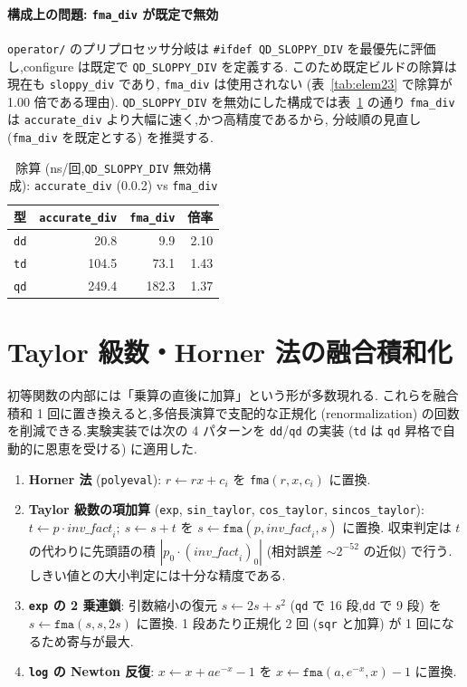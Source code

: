 \documentclass[a4paper,10pt]{ltjsarticle}
\begin{document}
\paragraph{構成上の問題: \texttt{fma\_div} が既定で無効}
\texttt{operator/} のプリプロセッサ分岐は \texttt{\#ifdef QD\_SLOPPY\_DIV}
を最優先に評価し,configure は既定で \texttt{QD\_SLOPPY\_DIV} を定義する.
このため既定ビルドの除算は現在も \texttt{sloppy\_div} であり,
\texttt{fma\_div} は使用されない (表~\ref{tab:elem23} で除算が 1.00 倍である理由).
\texttt{QD\_SLOPPY\_DIV} を無効にした構成では表~\ref{tab:divacc} の通り
\texttt{fma\_div} は \texttt{accurate\_div} より大幅に速く,かつ高精度であるから,
分岐順の見直し (\texttt{fma\_div} を既定とする) を推奨する.

\begin{table}[htbp]
\centering
\caption{除算 (ns/回,\texttt{QD\_SLOPPY\_DIV} 無効構成): \texttt{accurate\_div} (0.0.2) vs \texttt{fma\_div}}
\label{tab:divacc}
\begin{tabular}{l rrr}
\toprule
型 & \texttt{accurate\_div} & \texttt{fma\_div} & 倍率 \\
\midrule
\texttt{dd} & 20.8 & 9.9 & 2.10 \\
\texttt{td} & 104.5 & 73.1 & 1.43 \\
\texttt{qd} & 249.4 & 182.3 & 1.37 \\
\bottomrule
\end{tabular}
\end{table}

\section{Taylor 級数・Horner 法の融合積和化}
\label{sec:horner}

初等関数の内部には「乗算の直後に加算」という形が多数現れる.
これらを融合積和 1 回に置き換えると,多倍長演算で支配的な正規化
(renormalization) の回数を削減できる.実験実装では次の 4 パターンを
\texttt{dd}/\texttt{qd} の実装 (\texttt{td} は \texttt{qd} 昇格で自動的に恩恵を受ける)
に適用した.

\begin{enumerate}
  \item \textbf{Horner 法} (\texttt{polyeval}):
        $r \gets r x + c_i$ を \texttt{fma}$(r, x, c_i)$ に置換.
  \item \textbf{Taylor 級数の項加算} (\texttt{exp}, \texttt{sin\_taylor},
        \texttt{cos\_taylor}, \texttt{sincos\_taylor}):
        $t \gets p \cdot \mathit{inv\_fact}_i;\ s \gets s + t$ を
        $s \gets \texttt{fma}(p, \mathit{inv\_fact}_i, s)$ に置換.
        収束判定は $t$ の代わりに先頭語の積
        $|p_0 \cdot (\mathit{inv\_fact}_i)_0|$ (相対誤差 $\sim 2^{-52}$ の近似)
        で行う.しきい値との大小判定には十分な精度である.
  \item \textbf{\texttt{exp} の 2 乗連鎖}:
        引数縮小の復元 $s \gets 2s + s^2$ (\texttt{qd} で 16 段,\texttt{dd} で 9 段)
        を $s \gets \texttt{fma}(s, s, 2s)$ に置換.
        1 段あたり正規化 2 回 (\texttt{sqr} と加算) が 1 回になるため寄与が最大.
  \item \textbf{\texttt{log} の Newton 反復}:
        $x \gets x + a e^{-x} - 1$ を $x \gets \texttt{fma}(a, e^{-x}, x) - 1$ に置換.
\end{enumerate}
\end{document}

